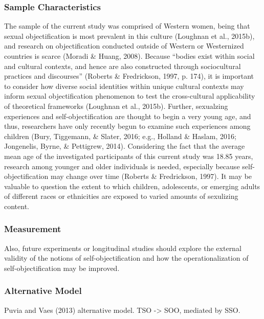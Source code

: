 \documentclass[man]{apa6}
\begin{document}
\subsubsection{Sample Characteristics}\label{sample-characteristics}

The sample of the current study was comprised of Western women, being
that sexual objectification is most prevalent in this culture (Loughnan
et al., 2015b), and research on objectification conducted outside of
Western or Westernized countries is scarce (Moradi \& Huang, 2008).
Because \enquote{bodies exist within social and cultural contexts, and
hence are also constructed through sociocultural practices and
discourses} (Roberts \& Fredrickson, 1997, p. 174), it is important to
consider how diverse social identities within unique cultural contexts
may inform sexual objectification phenomenon to test the cross-cultural
applicability of theoretical frameworks (Loughnan et al., 2015b).
Further, sexualzing experiences and self-objectification are thought to
begin a very young age, and thus, researchers have only recently begun
to examine such experiences among children (Bury, Tiggemann, \& Slater,
2016; e.g., Holland \& Haslam, 2016; Jongenelis, Byrne, \& Pettigrew,
2014). Considering the fact that the average mean age of the
investigated participants of this current study was 18.85 years,
research among younger and older individuals is needed, especially
because self-objectification may change over time (Roberts \&
Fredrickson, 1997). It may be valuable to question the extent to which
children, adolescents, or emerging adults of different races or
ethnicities are exposed to varied amounts of sexulizing content.

\subsubsection{Measurement}\label{measurement}

Also, future experiments or longitudinal studies should explore the
external validity of the notions of self-objectification and how the
operationalization of self-objectification may be improved.

\subsubsection{Alternative Model}\label{alternative-model}

Puvia and Vaes (2013) alternative model. TSO -\textgreater{} SOO,
mediated by SSO.
\end{document}
